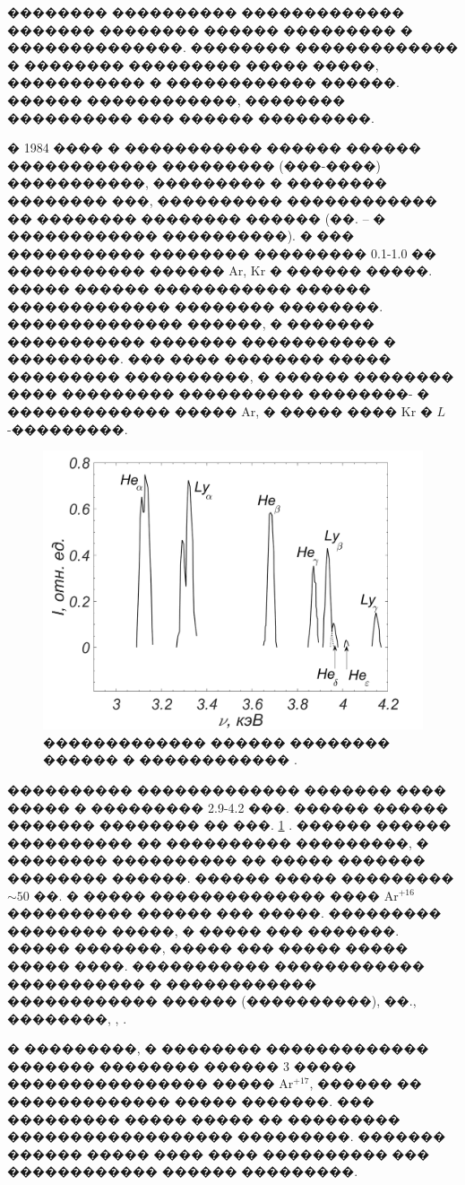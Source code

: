 \documentclass[12pt,titlepage]{article}
\begin{document}
�������� ���������� ������������� ������� �������� ������ ��������� � ��������������. �������� ������������� � �������� ��������� ����� �����, ����������� � ������������ ������. ������ ������������, �������� ���������� ��� ������ ���������.

� 1984 ���� � ����������� ������ ������ ������������ ��������� (���-����) �����������, ��������� � �������� �������� ���, ���������� ������������ �� �������� �������� ������ (��. \cite{Delamater1985} -- \cite{Florido2014} � ������������ ����������). � ��� ����������� �������� ��������� 0.1-1.0 �� ����������� ������ Ar, Kr � ������ �����. ����� ������ ����������� ������ ������������� �������� ��������. �������������� ������, � ������� ����������� ������� ����������� � ���������. ��� ���� �������� ����� ��������� ����������, � ������ �������� ���� ��������� ���������� ��������- � ������������� ����� Ar, � ����� ���� Kr � $L$-���������.

\begin{figure}[h!]
\centerline{
\includegraphics[width=0.7\linewidth]{Spectrum.png}
}
\caption{������������� ������ �������� ������ � ������������ \cite{Hooper1988}.} \label{figSpectrum}
\end{figure}

���������� ������������� ������� ���� ����� � ��������� 2.9-4.2 ���. ������ ������ ������� �������� �� ���. \ref{figSpectrum} \cite{Hooper1988}. ������ ������ ���������� �� ���������� ���������, � �������� ���������� �� ����� ������� �������� ������. ������ ����� ��������� $\sim50$ ��. � ����� �������������� ���� Ar$^{+16}$ ���������� ������ ��� �����. ��������� �������� �����, � ����� ��� �������. ����� �������, ����� ��� ����� ����� ����� ����. ����������� ������������ ����������� � ������������ ������������ ������ (����������), ��., ��������, \cite{BurrisMog2006}, \cite{Sinars2006}.

� ���������, � �������� ������������� ������� �������� ������ 3 ����� ���������������� ����� Ar$^{+17}$, ������ �� ������������� ����� �������. ��� ��������� ����� ����� �� ��������� ������������������ ���������. ������� ������ ����� ���� ���� ���������� ��� ������������ ������ ���������.
\end{document}
